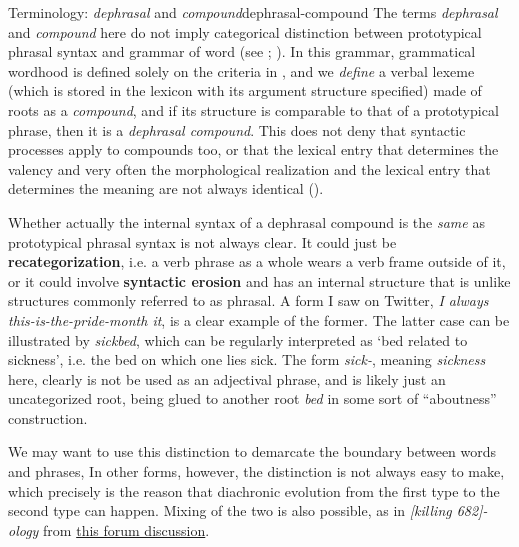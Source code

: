 \documentclass[UTF8, a4paper, oneside, scheme=plain, 12pt]{ctexrep}
\newcommand*{\concept}[1]{\textbf{#1}}
\newcommand*{\term}[1]{\emph{#1}}
\newcommand{\form}[1]{\emph{#1}}
\newcommand{\translate}[1]{`#1'}
\begin{document}
\begin{theorybox}{Terminology: \term{dephrasal} and \term{compound}}{dephrasal-compound}
    The terms \term{dephrasal} and \term{compound} here 
    do not imply categorical distinction between prototypical phrasal syntax and grammar of word
    (see ; \citealt{scher2014unifying}).
    In this grammar, grammatical wordhood is defined solely on the criteria in ,
    and we \emph{define} a verbal lexeme (which is stored in the lexicon with its argument structure specified)
    made of roots as a \term{compound},
    and if its structure is comparable to that of a prototypical phrase,
    then it is a \term{dephrasal compound}.
    This does not deny that syntactic processes apply to compounds too,
    or that the lexical entry that determines the valency and very often the morphological realization
    and the lexical entry that determines the meaning are not always identical
    ().

    Whether actually the internal syntax of a dephrasal compound is the \emph{same} as prototypical phrasal syntax is not always clear.
    It could just be \concept{recategorization}, i.e. a verb phrase as a whole wears a verb frame outside of it,
    or it could involve \concept{syntactic erosion} and has an internal structure that is unlike structures commonly referred to as phrasal.
    A form I saw on Twitter, \form{I always this-is-the-pride-month it},
    is a clear example of the former.
    The latter case can be illustrated by \form{sickbed},
    which can be regularly interpreted as \translate{bed related to sickness}, 
    i.e. the bed on which one lies sick.
    The form \form{sick-}, meaning \form{sickness} here,
    clearly is not be used as an adjectival phrase,
    and is likely just an uncategorized root,
    being glued to another root \form{bed} in some sort of ``aboutness'' construction.

    We may want to use this distinction to demarcate the boundary between words and phrases,
    In other forms, however, the distinction is not always easy to make,
    which precisely is the reason that diachronic evolution from the first type to the second type can happen.
    Mixing of the two is also possible, as in \form{[killing 682]-ology} from \href{https://scp-wiki.wikidot.com/forum/t-410418/scp-1066}{this forum discussion}.


\end{theorybox}
\end{document}
